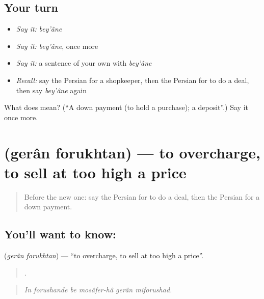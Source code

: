 \subsection*{Your turn}
\begin{itemize}
\raggedright
  \item \emph{Say it:} \emph{bey'âne}
  \item \emph{Say it:} \emph{bey'âne}, once more
  \item \emph{Say it:} a sentence of your own with \emph{bey'âne}
  \item \emph{Recall:} say the Persian for a shopkeeper, then the Persian for to do a deal, then say \emph{bey'âne} again
\end{itemize}

\begin{tcolorbox}[breakable,colback=teal!4,colframe=teal!35!black,title={Before you move on}]
What does  mean? (\textquotedblleft{}A down payment (to hold a purchase); a deposit\textquotedblright{}.) Say it once more.
\end{tcolorbox}
\section[\texorpdfstring{\fa{گران} \fa{فروختن} (gerân forukhtan)}{گران فروختن (gerân forukhtan)}]{  (gerân forukhtan) — to overcharge, to sell at too high a price}

\label{lesson:FA-C464-geran-forukhtan}



\begin{quote}
Before the new one: say the Persian for to do a deal, then the Persian for a down payment.
\end{quote}

\subsection*{You'll want to know:  }
\textbf{ } (\emph{gerân forukhtan}) — \textquotedblleft{}to overcharge, to sell at too high a price\textquotedblright{}.

\begin{quote}
     .
\end{quote}

\begin{quote}
\emph{In forushande be mosâfer-hâ gerân miforushad.}
\end{quote}

